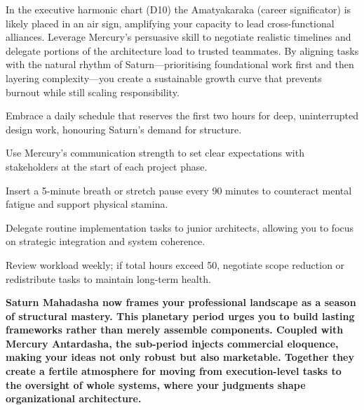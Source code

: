 {\fontsize{9}{13}\selectfont In the executive harmonic chart (D10) the Amatyakaraka (career significator) is likely placed in an air sign, amplifying your capacity to lead cross-functional alliances. Leverage Mercury's persuasive skill to negotiate realistic timelines and delegate portions of the architecture load to trusted teammates. By aligning tasks with the natural rhythm of Saturn---prioritising foundational work first and then layering complexity---you create a sustainable growth curve that prevents burnout while still scaling responsibility.}\par\vspace{1.8mm}

\begin{diamondlist}
  \item {\fontsize{8.5}{12}\selectfont Embrace a daily schedule that reserves the first two hours for deep, uninterrupted design work, honouring Saturn's demand for structure.}
  \item {\fontsize{8.5}{12}\selectfont Use Mercury's communication strength to set clear expectations with stakeholders at the start of each project phase.}
  \item {\fontsize{8.5}{12}\selectfont Insert a 5-minute breath or stretch pause every 90 minutes to counteract mental fatigue and support physical stamina.}
  \item {\fontsize{8.5}{12}\selectfont Delegate routine implementation tasks to junior architects, allowing you to focus on strategic integration and system coherence.}
  \item {\fontsize{8.5}{12}\selectfont Review workload weekly; if total hours exceed 50, negotiate scope reduction or redistribute tasks to maintain long-term health.}
\end{diamondlist}


\label{topic40}

{\fontsize{9.5}{13.8}\selectfont\bfseries\color{DeepSlate} Saturn Mahadasha now frames your professional landscape as a season of structural mastery.  This planetary period urges you to build lasting frameworks rather than merely assemble components.  Coupled with Mercury Antardasha, the sub-period injects commercial eloquence, making your ideas not only robust but also marketable.  Together they create a fertile atmosphere for moving from execution-level tasks to the oversight of whole systems, where your judgments shape organizational architecture.}\par\vspace{2mm}

